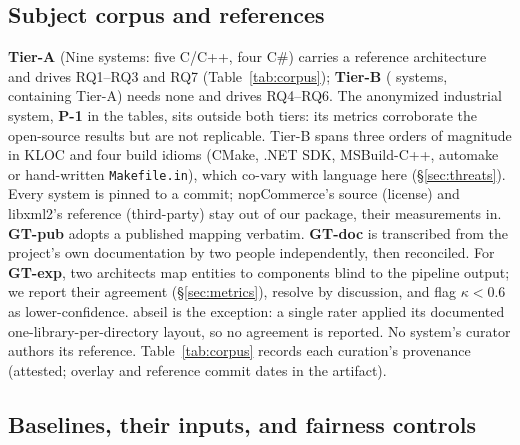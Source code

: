 \subsection{Subject corpus and references}
\label{sec:corpus}

\textbf{Tier-A} (Nine systems: five C/C++, four C\#) carries
a reference architecture and drives RQ1--RQ3 and RQ7 (Table~\ref{tab:corpus}); \textbf{Tier-B}
(\rqSevenSystems{} systems, containing Tier-A) needs none and drives RQ4--RQ6. The anonymized
industrial system, \textbf{P-1} in the tables, sits outside both tiers: its metrics corroborate
the open-source results but are not replicable. Tier-B spans three orders of magnitude in KLOC and
four build idioms (CMake, .NET SDK, MSBuild-C++, automake or hand-written \texttt{Makefile.in}),
which co-vary with language here (\S\ref{sec:threats}). Every system is pinned to a commit;
nopCommerce's source (license) and libxml2's reference (third-party) stay out of our package,
their measurements in. \textbf{GT-pub} adopts a published mapping verbatim. \textbf{GT-doc} is transcribed from the project's own documentation by two
people independently, then reconciled. For \textbf{GT-exp}, two architects map entities to
components blind to the pipeline output; we report their agreement (\S\ref{sec:metrics}), resolve
by discussion, and flag $\kappa<0.6$ as lower-confidence. abseil is the exception: a single
rater applied its documented one-library-per-directory layout, so no agreement is reported. No
system's curator authors its reference. Table~\ref{tab:corpus} records each curation's provenance (attested; overlay and
reference commit dates in the artifact).

\subsection{Baselines, their inputs, and fairness controls}
\label{sec:baselines}

